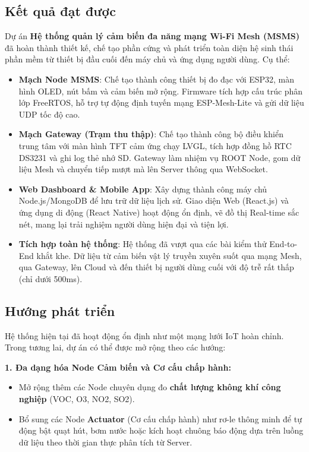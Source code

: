 \documentclass{article} %
\begin{document}
\subsection{Kết quả đạt được}
Dự án \textbf{Hệ thống quản lý cảm biến đa năng mạng Wi-Fi Mesh (MSMS)} đã hoàn thành thiết kế, chế tạo phần cứng và phát triển toàn diện hệ sinh thái phần mềm từ thiết bị đầu cuối đến máy chủ và ứng dụng người dùng. Cụ thể:
\begin{itemize}
    \item \textbf{Mạch Node MSMS}: Chế tạo thành công thiết bị đo đạc với ESP32, màn hình OLED, nút bấm và cảm biến mở rộng. Firmware tích hợp cấu trúc phân lớp FreeRTOS, hỗ trợ tự động định tuyến mạng ESP-Mesh-Lite và gửi dữ liệu UDP tốc độ cao.
    \item \textbf{Mạch Gateway (Trạm thu thập)}: Chế tạo thành công bộ điều khiển trung tâm với màn hình TFT cảm ứng chạy LVGL, tích hợp đồng hồ RTC DS3231 và ghi log thẻ nhớ SD. Gateway làm nhiệm vụ ROOT Node, gom dữ liệu Mesh và chuyển tiếp mượt mà lên Server thông qua WebSocket.
    \item \textbf{Web Dashboard \& Mobile App}: Xây dựng thành công máy chủ Node.js/MongoDB để lưu trữ dữ liệu lịch sử. Giao diện Web (React.js) và ứng dụng di động (React Native) hoạt động ổn định, vẽ đồ thị Real-time sắc nét, mang lại trải nghiệm người dùng hiện đại và tiện lợi.
    \item \textbf{Tích hợp toàn hệ thống}: Hệ thống đã vượt qua các bài kiểm thử End-to-End khắt khe. Dữ liệu từ cảm biến vật lý truyền xuyên suốt qua mạng Mesh, qua Gateway, lên Cloud và đến thiết bị người dùng cuối với độ trễ rất thấp (chỉ dưới 500ms).
\end{itemize}

\subsection{Hướng phát triển}
Hệ thống hiện tại đã hoạt động ổn định như một mạng lưới IoT hoàn chỉnh. Trong tương lai, dự án có thể được mở rộng theo các hướng:

\textbf{1. Đa dạng hóa Node Cảm biến và Cơ cấu chấp hành:}
\begin{itemize}
    \item Mở rộng thêm các Node chuyên dụng đo \textbf{chất lượng không khí công nghiệp} (VOC, O3, NO2, SO2).
    \item Bổ sung các Node \textbf{Actuator} (Cơ cấu chấp hành) như rơ-le thông minh để tự động bật quạt hút, bơm nước hoặc kích hoạt chuông báo động dựa trên luồng dữ liệu theo thời gian thực phân tích từ Server.
\end{itemize}
\end{document}
